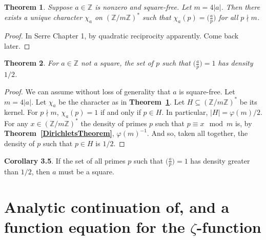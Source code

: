 \documentclass[12pt]{article}
\newcommand{\ints}{\mathbb{Z}}
\newcommand{\intsmod}[1]{\ints / #1 \ints}
\newcommand{\tref}[1]{\textbf{Theorem~\ref{#1}}}
\newtheorem{thm}{Theorem}
\numberwithin{equation}{section}
\numberwithin{thm}{section}
\numberwithin{lemma}{section}
\numberwithin{cor}{section}
\begin{document}
\begin{thm}\label{CharacterExtensionOfLegendreSymbol}
  Suppose $a \in \ints$ is nonzero and square-free. Let $m = 4 |a|$. Then there exists a unique character $\chi_a$ on $(\intsmod{m})^*$ such that $\chi_a(p) = \big(\frac{a}{p}\big)$ for all $p \nmid m$.
\end{thm}
\begin{proof}
  In Serre Chapter 1, by quadratic reciprocity apparently. Come back later.
\end{proof}

\begin{thm}\label{PrimeSquaresHaveHalfDensity}
  For $a \in \ints$ not a square, the set of $p$ such that $\big(\frac{a}{p} \big) = 1$ has density $1/2$.
\end{thm}
\begin{proof}
  We can assume without loss of generality that $a$ is square-free. Let $m = 4 |a|$. Let $\chi_a$ be the character as in \tref{CharacterExtensionOfLegendreSymbol}. Let $H \subseteq (\intsmod{m})^*$ be its kernel. For $p \nmid m$, $\chi_a(p) = 1$ if and only if $p \in H$. In particular, $|H| = \varphi(m)/2$. For any $x \in (\intsmod{m})^*$ the density of primes $p$ such that $p \equiv x \mod m$ is, by \tref{DirichletsTheorem}, $\varphi(m)^{-1}$. And so, taken all together, the density of $p$ such that $p \in H$ is $1/2$.
\end{proof}

\textbf{Corollary 3.5}. If the set of all primes $p$ such that $\big( \frac{a}{p} \big) = 1$ has density greater than $1/2$, then $a$ must be a square.

\section{Analytic continuation of, and a function equation for the $\zeta$-function}
\end{document}
